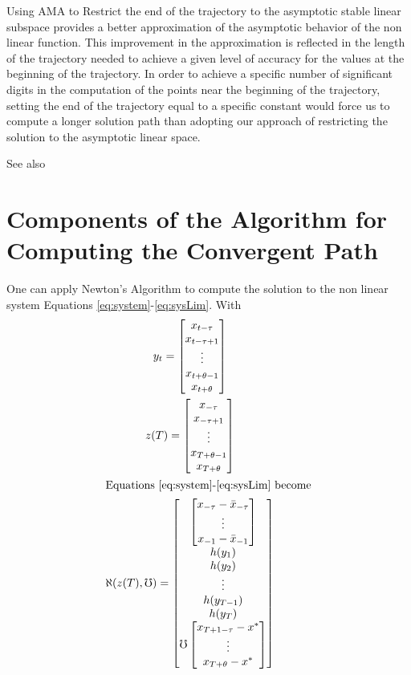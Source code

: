 \documentclass[12pt]{article}
\begin{document}
Using AMA to Restrict the end of the trajectory to the
asymptotic stable linear subspace provides a better approximation of the
asymptotic behavior of the non linear function.
This improvement in the approximation is reflected in the length of
the trajectory needed to achieve a given level of accuracy for the
values at the beginning of the trajectory.
In order to achieve a specific number of
significant digits in the computation of the points near the beginning
of the trajectory, setting the end of the trajectory  equal to a
specific constant would force us to  compute a longer solution path than
adopting our approach of
restricting the solution to the asymptotic linear space.

See also\cite{brayton11:_two_pract_algor}


\section{Components of the Algorithm for Computing the Convergent Path}
One can apply Newton's Algorithm to compute  the solution to the
non linear system Equations \ref{eq:system}-\ref{eq:sysLim}.
With
\begin{gather}
y_t = \label{eq:withMho}
\begin{bmatrix}
x_{t-\tau}\\ x_{t-\tau+1}\\ \vdots \\ x_{t+\theta -1} \\x_{t+\theta}
\end{bmatrix}\\
z(T) = \begin{bmatrix}
x_{-\tau}\\ x_{-\tau+1}\\ \vdots \\ x_{T+\theta -1} \\x_{T+\theta}
\end{bmatrix}\\
\intertext{Equations \ref{eq:system}-\ref{eq:sysLim} become}
\aleph(z(T),\mho)=
\begin{bmatrix}
  \begin{bmatrix}
x_{-\tau}-\bar{x}_{-\tau}\\
\vdots\\
x_{-1}-\bar{x}_{-1}
  \end{bmatrix}\\
  h(y_1)\\h(y_2)\\ \vdots\\ h(y_{T-1}) \\ h(y_T)\\
 \mho  \begin{bmatrix}
x_{T+1-\tau}-x^\ast\\
\vdots\\
x_{T+\theta}-x^\ast
  \end{bmatrix}
\end{bmatrix}
\end{gather}
\end{document}
